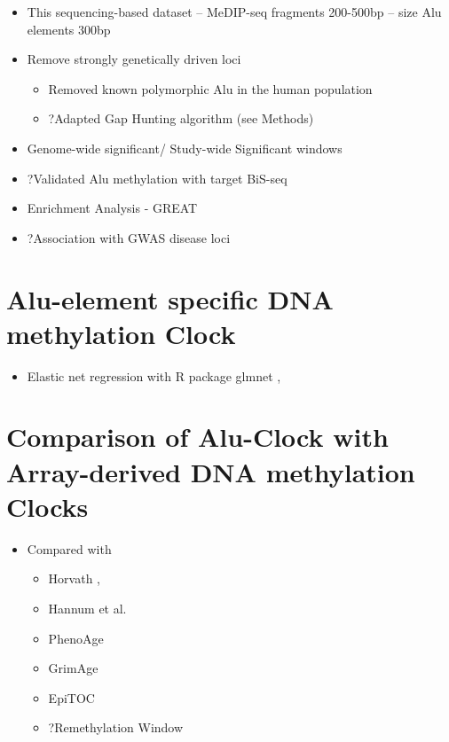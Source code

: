 \documentclass[]{book}
\providecommand{\tightlist}{%
  \setlength{\itemsep}{0pt}\setlength{\parskip}{0pt}}
\begin{document}
\begin{itemize}
\tightlist
\item
  This sequencing-based dataset -- MeDIP-seq fragments 200-500bp -- size Alu elements 300bp
\item
  Remove strongly genetically driven loci

  \begin{itemize}
  \tightlist
  \item
    Removed known polymorphic Alu in the human population \citep{Payer2017}
  \item
    ?Adapted Gap Hunting algorithm (see Methods)
  \end{itemize}
\item
  Genome-wide significant/ Study-wide Significant windows
\item
  ?Validated Alu methylation with target BiS-seq
\item
  Enrichment Analysis - GREAT \citep{McLean2010}
\item
  ?Association with GWAS disease loci
\end{itemize}

\hypertarget{alu-element-specific-dna-methylation-clock}{%
\section{Alu-element specific DNA methylation Clock}\label{alu-element-specific-dna-methylation-clock}}

\begin{itemize}
\tightlist
\item
  Elastic net regression with R package glmnet \citep{Friedman2010}, \citep{Engebretsen2019}
\end{itemize}

\hypertarget{comparison-of-alu-clock-with-array-derived-dna-methylation-clocks}{%
\section{Comparison of Alu-Clock with Array-derived DNA methylation Clocks}\label{comparison-of-alu-clock-with-array-derived-dna-methylation-clocks}}

\begin{itemize}
\tightlist
\item
  Compared with

  \begin{itemize}
  \tightlist
  \item
    Horvath \citep{Horvath2013} ,
  \item
    Hannum et al.~\citep{Hannum2013}
  \item
    PhenoAge \citep{Levine2018}
  \item
    GrimAge \citep{Lu2019}
  \item
    EpiTOC \citep{Yang2016}
  \item
    ?Remethylation Window \citep{Zhou2018}
  \end{itemize}
\end{itemize}
\end{document}
